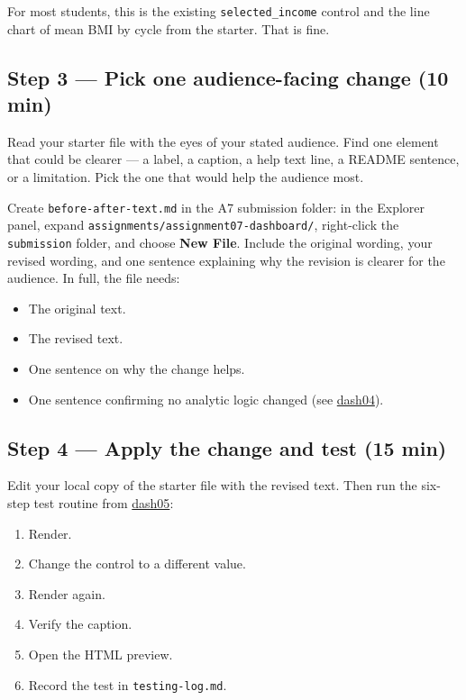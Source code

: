 \documentclass[
  letterpaper,
  DIV=11,
  numbers=noendperiod,
  oneside]{scrreprt}
\providecommand{\tightlist}{%
  \setlength{\itemsep}{0pt}\setlength{\parskip}{0pt}}
\begin{document}
For most students, this is the existing \texttt{selected\_income}
control and the line chart of mean BMI by cycle from the starter. That
is fine.

\subsection*{Step 3 --- Pick one audience-facing change (10
min)}\label{step-3-pick-one-audience-facing-change-10-min}

Read your starter file with the eyes of your stated audience. Find one
element that could be clearer --- a label, a caption, a help text line,
a README sentence, or a limitation. Pick the one that would help the
audience most.

Create \texttt{before-after-text.md} in the A7 submission folder: in the
Explorer panel, expand \texttt{assignments/assignment07-dashboard/},
right-click the \texttt{submission} folder, and choose \textbf{New
File}. Include the original wording, your revised wording, and one
sentence explaining why the revision is clearer for the audience. In
full, the file needs:

\begin{itemize}
\tightlist
\item
  The original text.
\item
  The revised text.
\item
  One sentence on why the change helps.
\item
  One sentence confirming no analytic logic changed (see
  \hyperref[audience-facing-text-what-you-can-and-cannot-change-for-a7]{dash04}).
\end{itemize}

\subsection*{Step 4 --- Apply the change and test (15
min)}\label{step-4-apply-the-change-and-test-15-min}

Edit your local copy of the starter file with the revised text. Then run
the six-step test routine from
\hyperref[testing-privacy-safe-publishing-and-the-shiny-demo]{dash05}:

\begin{enumerate}
\def\labelenumi{\arabic{enumi}.}
\tightlist
\item
  Render.
\item
  Change the control to a different value.
\item
  Render again.
\item
  Verify the caption.
\item
  Open the HTML preview.
\item
  Record the test in \texttt{testing-log.md}.
\end{enumerate}
\end{document}
